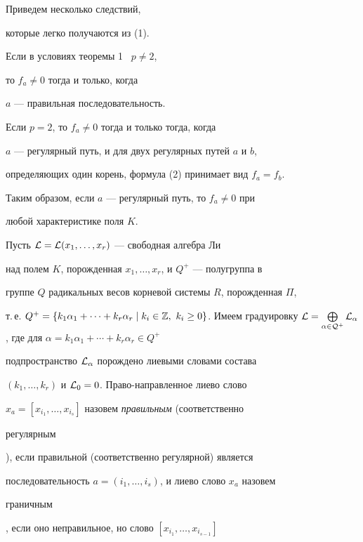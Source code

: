 Приведем несколько следствий,


которые легко получаются из (1).





\begin{cor}


Если в условиях теоремы 1 \ $p\ne 2$,


то $f_a\ne 0$ тогда и только, когда


$a$ --- правильная последовательность.


Если $p=2$, то $f_a\ne 0$ тогда и только тогда, когда


$a$ --- регулярный путь, и для двух регулярных путей $a$ и $b$,


определяющих один корень, формула (2) принимает вид $f_a=f_b$.


\end{cor}





Таким образом, если $a$ --- регулярный путь, то $f_a\ne 0$ при


любой характеристике поля $K$.





Пусть ${\cal L}={\cal L}(x_1,\dotsc,x_r)$ --- свободная алгебра Ли


над полем $K$, порожденная $x_1,\dotsc,x_r$, и $Q^+$ --- полугруппа в


группе $Q$ радикальных весов корневой системы $R$, порожденная $\Pi$,


т.\,е. $Q^+=\{k_1\alpha_1+\dotsb+k_r\alpha_r\mid k_i\in \Bbb Z,\ k_i\ge


0\}$. Имеем градуировку $\cal L=\bigoplus\limits_{\alpha\in Q^+}


\cal L_\alpha$, где для $\alpha=k_1\alpha_1+\dotsb+k_r\alpha_r\in Q^+$


подпространство $\cal L_\alpha$ порождено лиевыми словами состава


$(k_1,\dotsc,k_r)$ и ${\cal L}_0=0$. Право-направленное лиево слово


$x_a=[x_{i_1},\dotsc,x_{i_s}]$ назовем {\it правильным} (соответственно {\it


регулярным}), если правильной (соответственно регулярной) является


последовательность $a=(i_1,\dotsc,i_s)$, и лиево слово $x_a$ назовем {\it


граничным}, если оно неправильное, но слово $[x_{i_1}, \dotsc,x_{i_{s-1}}]$


